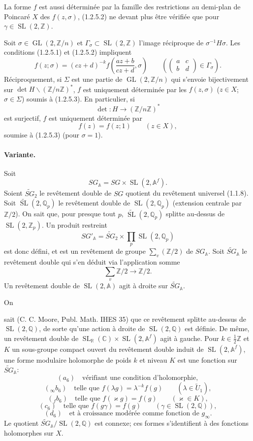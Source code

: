 \documentclass[10pt,a4paper]{article}
\providecommand{\GL}{\operatorname{GL}}
\providecommand{\SL}{\operatorname{SL}}
\providecommand{\R}{\mathbb R}
\providecommand{\Q}{\mathbb Q}
\providecommand{\Z}{\mathbb Z}
\providecommand{\C}{\mathbb C}
\providecommand{\A}{\mathbb A}
\providecommand{\Af}{\mathbb A^f}
\providecommand{\SG}{SG}
\begin{document}
La forme $f$ est aussi déterminée par la famille des restrictions au demi-plan de Poincaré $X$ des $f(z,\sigma)$, (1.2.5.2) ne devant plus être vérifiée que pour $\gamma\in\SL(2,\Z)$.

Soit $\sigma\in\GL(2,\Z/n)$ et $\Gamma_\sigma\subset\SL(2,\Z)$ l'image réciproque de $\sigma^{-1}H\sigma$. Les conditions (1.2.5.1) et (1.2.5.2) impliquent
\[
\tag{1.2.5.3}
f(z;\sigma)=(cz+d)^{-k}f\left(\frac{az+b}{cz+d},\sigma\right)
\qquad
\left(\begin{pmatrix}a&c\\ b&d\end{pmatrix}\in\Gamma_\sigma\right).
\]
Réciproquement, si $\Sigma$ est une partie de $\GL(2,\Z/n)$ qui s'envoie bijectivement sur $\det H\backslash(\Z/n\Z)^*$, $f$ est uniquement déterminée par les $f(z,\sigma)$ ($z\in X$; $\sigma\in\Sigma$) soumis à (1.2.5.3). En particulier, si
\[
\det:H\longrightarrow(\Z/n\Z)^*
\]
est surjectif, $f$ est uniquement déterminée par
\[
f(z)=f(z;1)\qquad(z\in X),
\]
soumise à (1.2.5.3) (pour $\sigma=1$).

\paragraph{Variante.} Soit
\[
\SG_{\A}=\SG\times\SL(2,\Af).
\]
Soient $\widetilde{\SG}_2$ le revêtement double de $\SG$ quotient du revêtement universel (1.1.8). Soit $\widetilde{\SL}(2,\Q_p)$ le revêtement double de $\SL(2,\Q_p)$ (extension centrale par $\Z/2$). On sait que, pour presque tout $p$, $\widetilde{\SL}(2,\Q_p)$ splitte au-dessus de $\SL(2,\Z_p)$. Un produit restreint
\[
\SG'_{\A}=\widetilde{\SG}_2\times\prod_p\SL(2,\Q_p)
\]
est donc défini, et est un revêtement de groupe $\sum_v(\Z/2)$ de $\SG_\A$. Soit $\widetilde{\SG}_{\A}$ le revêtement double qui s'en déduit via l'application somme
\[
\sum_v\Z/2\longrightarrow\Z/2.
\]
Un revêtement double de $\SL(2,\A)$ agit à droite sur $\widetilde{\SG}_\A$.

On

\clearpage
{}
\hypertarget{authority-19}{}
sait (C. C. Moore, Publ. Math. IHES 35) que ce revêtement splitte au-dessus de $\SL(2,\Q)$, de sorte qu'une action à droite de $\SL(2,\Q)$ est définie. De même, un revêtement double de $\SL_{\R}(\C)\times\SL(2,\Af)$ agit à gauche. Pour $k\in\tfrac12\Z$ et $K$ un sous-groupe compact ouvert du revêtement double induit de $\SL(2,\Af)$, une forme modulaire holomorphe de poids $k$ et niveau $K$ est une fonction sur $\widetilde{\SG}_\A$:
\[
(a_6)\quad\text{vérifiant une condition d'holomorphie},
\]
\[
({}_{\infty}b_6)\quad\text{telle que }f(\lambda g)=\lambda^{-k}f(g)\qquad(\lambda\in\widetilde U_1),
\]
\[
({}_{f}b_6)\quad\text{telle que }f(\varkappa g)=f(g)\qquad(\varkappa\in K),
\]
\[
(c_6)\quad\text{telle que }f(g\gamma)=f(g)\qquad(\gamma\in\SL(2,\Q)),
\]
\[
(d_6)\quad\text{et à croissance modérée comme fonction de }g_\infty.
\]
Le quotient $\widetilde{\SG}_{\A}/\SL(2,\Q)$ est connexe; ces formes s'identifient à des fonctions holomorphes sur $X$.
\end{document}
